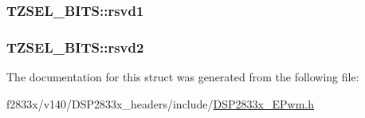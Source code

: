 \subsubsection[{rsvd1}]{ T\+Z\+S\+E\+L\+\_\+\+B\+I\+T\+S\+::rsvd1}\label{struct_t_z_s_e_l___b_i_t_s_a304f548f3ec68f52f7bdd63fdc85fed2}
\hypertarget{struct_t_z_s_e_l___b_i_t_s_ab31d39271cc393d2e6f5e8ca6fdec555}{}
\subsubsection[{rsvd2}]{ T\+Z\+S\+E\+L\+\_\+\+B\+I\+T\+S\+::rsvd2}\label{struct_t_z_s_e_l___b_i_t_s_ab31d39271cc393d2e6f5e8ca6fdec555}


The documentation for this struct was generated from the following file\+:\begin{DoxyCompactItemize}
\item 
f2833x/v140/\+D\+S\+P2833x\+\_\+headers/include/\hyperlink{_d_s_p2833x___e_pwm_8h}{D\+S\+P2833x\+\_\+\+E\+Pwm.\+h}\end{DoxyCompactItemize}
